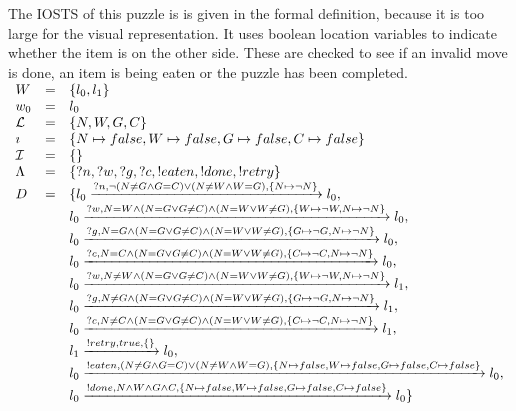 The IOSTS of this puzzle is is given in the formal definition, because it is too large for the visual representation. It uses boolean location variables to indicate whether the item is on the other side. These are checked to see if an invalid move is done, an item is being eaten or the puzzle has been completed.
\vspace{5px} \\
$\begin{array}{lcl}
W & = & \{l_0, l_1\} \\
w_0 & = & l_0 \\
\mathcal{L} & = & \{N,W,G,C\} \\
\imath & = & \{N \mapsto false, W \mapsto false, G \mapsto false, C \mapsto false\} \\
\mathcal{I} & = & \{\} \\
\Lambda & = & \{?n, ?w, ?g, ?c, !eaten, !done, !retry\} \\
D & = & \{l_0\xrightarrow{?n, \neg(N \neq G \land G=C)\lor(N \neq W \land W=G), \{N \mapsto \neg N\}}l_0, \\
& & l_0\xrightarrow{?w, N=W \land (N = G \lor G\neq C)\land (N = W \lor W\neq G), \{W \mapsto \neg W, N \mapsto \neg N\}}l_0,\\
& & l_0\xrightarrow{?g, N=G \land (N = G \lor G\neq C)\land (N = W \lor W\neq G), \{G \mapsto \neg G, N \mapsto \neg N\}}l_0,\\
& & l_0\xrightarrow{?c, N=C \land (N = G \lor G\neq C)\land (N = W \lor W\neq G), \{C \mapsto \neg C, N \mapsto \neg N\}}l_0,\\
& & l_0\xrightarrow{?w, N\neq W \land (N = G \lor G\neq C)\land (N = W \lor W\neq G), \{W \mapsto \neg W, N \mapsto \neg N\}}l_1,\\
& & l_0\xrightarrow{?g, N\neq G \land (N = G \lor G\neq C)\land (N = W \lor W\neq G), \{G \mapsto \neg G, N \mapsto \neg N\}}l_1,\\
& & l_0\xrightarrow{?c, N\neq C \land (N = G \lor G\neq C)\land (N = W \lor W\neq G), \{C \mapsto \neg C, N \mapsto \neg N\}}l_1,\\
& & l_1\xrightarrow{!retry,true,\{\}}l_0,\\
& & l_0\xrightarrow{!eaten, (N \neq G \land G=C)\lor(N \neq W \land W=G), \{N \mapsto false, W \mapsto false, G \mapsto false, C \mapsto false\}}l_0, \\
& & l_0\xrightarrow{!done, N \land W \land G \land C, \{N \mapsto false, W \mapsto false, G \mapsto false, C \mapsto false\}}l_0\}
\end{array}$

